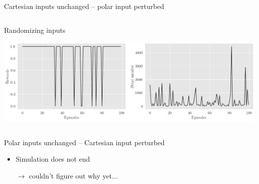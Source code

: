 \documentclass[bigger]{beamer}
\begin{document}
\begin{frame}[label={sec:org5cd39f8}]{Cartesian inputs unchanged -- polar input perturbed}
\begin{columns}
\begin{column}[c]{0.5\columnwidth}
\begin{center}
\end{center}
\begin{center}
\footnotesize
Randomizing inputs
\end{center}
\begin{center}
\includegraphics[width=\textwidth]{medias/steps-and-rewards-LeftRight-perturb-rand.png}
\end{center}
\end{column}
\end{columns}
\end{frame}
\begin{frame}[label={sec:org11b93ae}]{Polar inputs unchanged -- Cartesian input perturbed}
\begin{itemize}
\item Simulation does not end

\(\to\) couldn't figure out why yet\(\dots\)
\end{itemize}
\end{frame}
\end{document}
